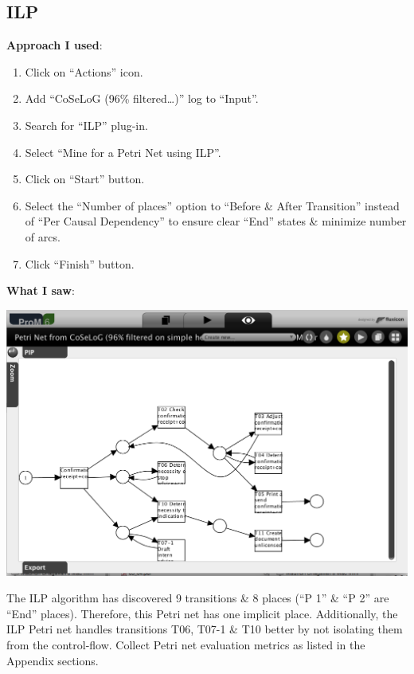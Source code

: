 \documentclass[]{article}
\begin{document}
\subsection{ILP}\label{ilp}

\textbf{Approach I used}:

\begin{enumerate}
\def\labelenumi{\arabic{enumi}.}
\itemsep1pt\parskip0pt
\item
  Click on ``Actions'' icon.
\item
  Add ``CoSeLoG (96\% filtered\ldots{})'' log to ``Input''.\\
\item
  Search for ``ILP'' plug-in.
\item
  Select ``Mine for a Petri Net using ILP''.
\item
  Click on ``Start'' button.
\item
  Select the ``Number of places'' option to ``Before \& After
  Transition'' instead of ``Per Causal Dependency'' to ensure clear
  ``End'' states \& minimize number of arcs.
\item
  Click ``Finish'' button.
\end{enumerate}

\textbf{What I saw}:

\includegraphics{CoSeLoG_Step_05_Filter96_PetriNet_ILP.png}

The ILP algorithm has discovered 9 transitions \& 8 places (``P 1'' \&
``P 2'' are ``End'' places). Therefore, this Petri net has one implicit
place. Additionally, the ILP Petri net handles transitions T06, T07-1 \&
T10 better by not isolating them from the control-flow. Collect Petri
net evaluation metrics as listed in the Appendix sections.
\end{document}
